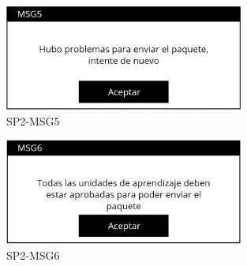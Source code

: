  \begin{figure}
  \centering
    \includegraphics[width=0.7\textwidth]{DCU/SP2/mensajes/MSG5}
  \caption{SP2-MSG5}
  \label{SP2-MSG5}
\end{figure}

 \begin{figure}
  \centering
    \includegraphics[width=0.7\textwidth]{DCU/SP2/mensajes/MSG6}
  \caption{SP2-MSG6}
  \label{SP2-MSG6}
\end{figure}

